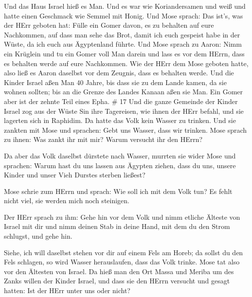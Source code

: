  Und das Haus Israel hieß es Man. Und es war wie
Koriandersamen und weiß und hatte einen Geschmack wie Semmel mit Honig.
 Und Mose sprach: Das ist's, was der HErr geboten hat:
Fülle ein Gomer davon, es zu behalten auf eure Nachkommen, auf dass man
sehe das Brot, damit ich euch gespeist habe in der Wüste, da ich euch
aus Ägyptenland führte.  Und Mose sprach zu Aaron: Nimm ein
Krüglein und tu ein Gomer voll Man darein und lass es vor dem HErrn,
dass es behalten werde auf eure Nachkommen.  Wie der HErr
dem Mose geboten hatte, also ließ es Aaron daselbst vor dem Zeugnis,
dass es behalten werde.  Und die Kinder Israel aßen Man 40
Jahre, bis dass sie zu dem Lande kamen, da sie wohnen sollten; bis an
die Grenze des Landes Kanaan aßen sie Man.  Ein Gomer aber
ist der zehnte Teil eines Epha. \# 17  Und die ganze
Gemeinde der Kinder Israel zog aus der Wüste Sin ihre Tagereisen, wie
ihnen der HErr befahl, und sie lagerten sich in Raphidim. Da hatte das
Volk kein Wasser zu trinken.  Und sie zankten mit Mose und
sprachen: Gebt uns Wasser, dass wir trinken. Mose sprach zu ihnen: Was
zankt ihr mit mir? Warum versucht ihr den HErrn?

 Da aber das Volk daselbst dürstete nach Wasser, murrten sie
wider Mose und sprachen: Warum hast du uns lassen aus Ägypten ziehen,
dass du uns, unsere Kinder und unser Vieh Durstes sterben ließest?

 Mose schrie zum HErrn und sprach: Wie soll ich mit dem Volk
tun? Es fehlt nicht viel, sie werden mich noch steinigen.

 Der HErr sprach zu ihm: Gehe hin vor dem Volk und nimm
etliche Älteste von Israel mit dir und nimm deinen Stab in deine Hand,
mit dem du den Strom schlugst, und gehe hin.

 Siehe, ich will daselbst stehen vor dir auf einem Fels am
Horeb; da sollst du den Fels schlagen, so wird Wasser herauslaufen, dass
das Volk trinke. Mose tat also vor den Ältesten von Israel. 
Da hieß man den Ort Massa und Meriba um des Zanks willen der Kinder
Israel, und dass sie den HErrn versucht und gesagt hatten: Ist der HErr
unter uns oder nicht?

